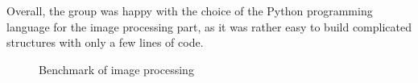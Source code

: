 \begin{itemize}
Overall, the group was happy with the choice of the Python programming language for the image processing part, as it was rather easy to build complicated structures with only a few lines of code.

\begin{figure}[htb]
	\centering
	\quad
	\caption{Benchmark of image processing}
	\label{fig:benchmark_image_processing}
\end{figure}
\end{itemize}
